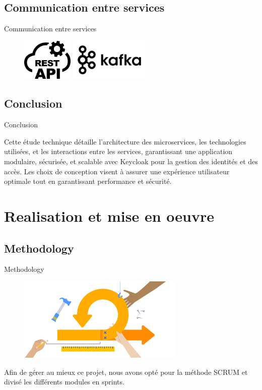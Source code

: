 \documentclass{beamer}
\begin{document}
\subsection{Communication entre services}
\begin{frame}{Communication entre services}
   \begin{figure}[htpb]
        \centering
        \includegraphics[height=2cm]{pic/rest.png}
         \hspace{0.1\textwidth}
         \includegraphics[height=2cm]{pic/kafka.png}
    \end{figure}
\end{frame}

\subsection{Conclusion}
\begin{frame}{Conclusion}

    Cette étude technique détaille l'architecture des microservices, les technologies utilisées, et les interactions entre les services, garantissant une application modulaire, sécurisée, et scalable avec Keycloak pour la gestion des identités et des accès. Les choix de conception visent à assurer une expérience utilisateur optimale tout en garantissant performance et sécurité.
\end{frame}

\section{Realisation et mise en oeuvre}

\subsection{Methodology}
\begin{frame}{Methodology}
    
    \begin{figure}[htpb]
        \centering
        \includegraphics[height=4cm]{pic/scrum.png}
    \end{figure}

    Afin de gérer au mieux ce projet, nous avons opté pour la méthode SCRUM et divisé les différents modules en sprints.
\end{frame}
\end{document}
